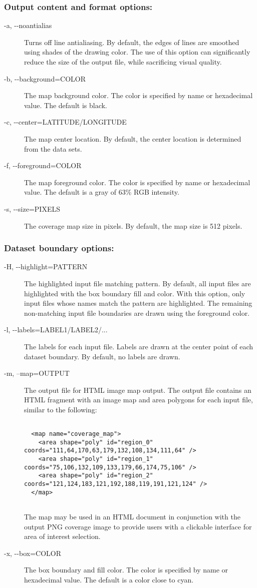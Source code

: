 \subsubsection*{Output content and format options:}
\begin{description}
\item[ -a, -{-}noantialias ] Turns off line antialiasing. By default, the edges of lines are smoothed using shades of the drawing color. The use of this option can significantly reduce the size of the output file, while sacrificing visual quality. 
\item[ -b, -{-}background=COLOR ] The map background color. The color is specified by name or hexadecimal value. The default is black. 
\item[ -c, -{-}center=LATITUDE/LONGITUDE ] The map center location. By default, the center location is determined from the data sets. 
\item[ -f, -{-}foreground=COLOR ] The map foreground color. The color is specified by name or hexadecimal value. The default is a gray of 63\% RGB intensity. 
\item[ -s, -{-}size=PIXELS ] The coverage map size in pixels. By default, the map size is 512 pixels. 

\end{description}
\subsubsection*{Dataset boundary options:}
\begin{description}
\item[ -H, -{-}highlight=PATTERN ] The highlighted input file matching pattern. By default, all input files are highlighted with the box boundary fill and color. With this option, only input files whose names match the pattern are highlighted. The remaining non-matching input file boundaries are drawn using the foreground color. 
\item[ -l, -{-}labels=LABEL1/LABEL2/... ] The labels for each input file. Labels are drawn at the center point of each dataset boundary. By default, no labels are drawn. 
\item[ -m, --map=OUTPUT ] The output file for HTML image map output. The output file contains an HTML fragment with an image map and area polygons for each input file, similar to the following: \begin{verbatim}

  <map name="coverage_map">
    <area shape="poly" id="region_0" coords="111,64,170,63,179,132,108,134,111,64" />
    <area shape="poly" id="region_1" coords="75,106,132,109,133,179,66,174,75,106" />
    <area shape="poly" id="region_2" coords="121,124,183,121,192,188,119,191,121,124" />
  </map>
   
\end{verbatim}
 The map may be used in an HTML document in conjunction with the output PNG coverage image to provide users with a clickable interface for area of interest selection. 
\item[ -x, -{-}box=COLOR ] The box boundary and fill color. The color is specified by name or hexadecimal value. The default is a color close to cyan. 

\end{description}
